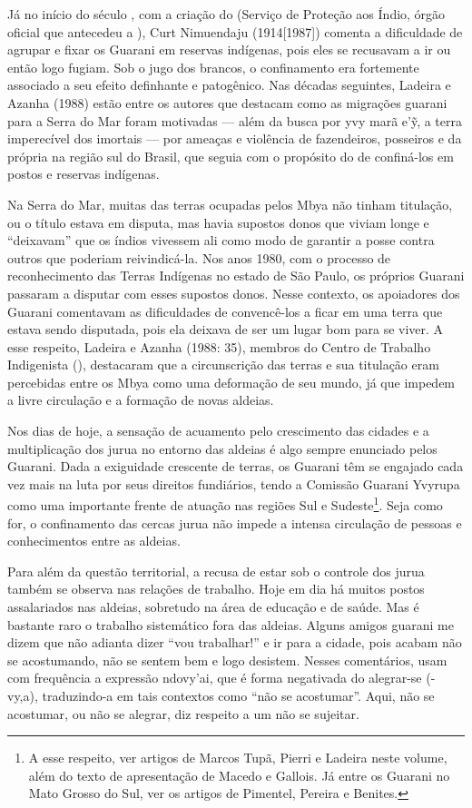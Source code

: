 Já no início do século , com a criação do  (Serviço de Proteção aos
Índio, órgão oficial que antecedeu a ), Curt Nimuendaju
(1914[1987]) comenta a dificuldade de agrupar e fixar os Guarani em
reservas indígenas, pois eles se recusavam a ir ou então logo fugiam.
Sob o jugo dos brancos, o confinamento era fortemente associado a seu
efeito definhante e patogênico. Nas décadas seguintes, Ladeira e Azanha
(1988) estão entre os autores que destacam como as migrações guarani
para a Serra do Mar foram motivadas --- além da busca por yvy marã
e’\~{y}, a terra imperecível dos imortais --- por ameaças e violência de
fazendeiros, posseiros e da própria  na região sul do Brasil, que
seguia com o propósito do  de confiná-los em postos e reservas
indígenas.

Na Serra do Mar, muitas das terras ocupadas pelos Mbya não tinham
titulação, ou o título estava em disputa, mas havia supostos donos que
viviam longe e ``deixavam'' que os índios vivessem ali como modo de
garantir a posse contra outros que poderiam reivindicá-la. Nos anos
1980, com o processo de reconhecimento das Terras Indígenas no estado
de São Paulo, os próprios Guarani passaram a disputar com esses
supostos donos. Nesse contexto, os apoiadores dos Guarani comentavam as
dificuldades de convencê-los a ficar em uma terra que estava sendo
disputada, pois ela deixava de ser um lugar bom para se viver. A esse
respeito, Ladeira e Azanha (1988: 35), membros do Centro de Trabalho
Indigenista (), destacaram que a circunscrição das terras e sua
titulação eram percebidas entre os Mbya como uma deformação de seu
mundo, já que impedem a livre circulação e a formação de novas aldeias.

Nos dias de hoje, a sensação de acuamento pelo crescimento das cidades e
a multiplicação dos jurua no entorno das aldeias é algo sempre
enunciado pelos Guarani. Dada a exiguidade crescente de terras, os
Guarani têm se engajado cada vez mais na luta por seus direitos
fundiários, tendo a Comissão Guarani Yvyrupa como uma importante frente
de atuação nas regiões Sul e Sudeste\footnote{A esse respeito, ver
artigos de Marcos Tupã, Pierri e Ladeira neste volume, além do texto de
apresentação de Macedo e Gallois. Já entre os Guarani no Mato Grosso do
Sul, ver os artigos de Pimentel, Pereira e Benites.}. Seja como for, o
confinamento das cercas jurua não impede a intensa circulação de
pessoas e conhecimentos entre as aldeias. 

Para além da questão territorial, a recusa de estar sob o controle dos
jurua também se observa nas relações de trabalho. Hoje em dia há muitos
postos assalariados nas aldeias, sobretudo na área de educação e de
saúde. Mas é bastante raro o trabalho sistemático fora das aldeias.
Alguns amigos guarani me dizem que não adianta dizer ``vou trabalhar!'' e
ir para a cidade, pois acabam não se acostumando, não se sentem bem e
logo desistem. Nesses comentários, usam com frequência a expressão
ndovy’ai, que é forma negativada do alegrar-se (-vy,a), traduzindo-a em
tais contextos como ``não se acostumar''. Aqui, não se acostumar, ou não
se alegrar, diz respeito a um não se sujeitar.

